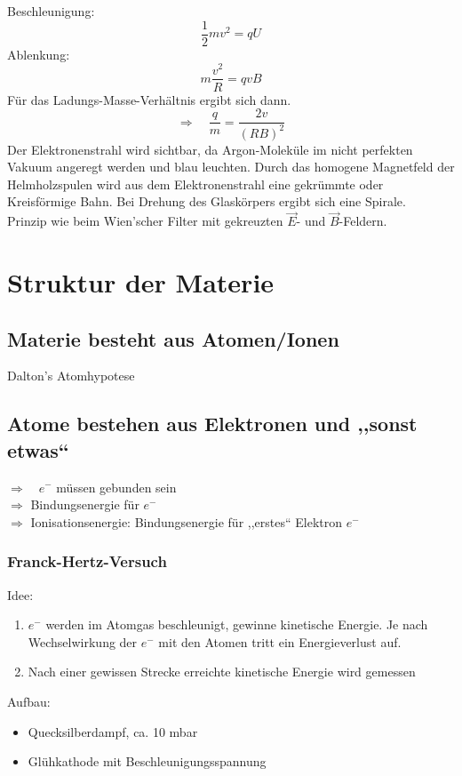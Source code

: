 \\
\\
Beschleunigung:
\begin{equation*}
\frac{1}{2} m v^2 = q U
\end{equation*}
Ablenkung:
\begin{equation*}
m \frac{v^2}{R} = q v B
\end{equation*}
Für das Ladungs-Masse-Verhältnis ergibt sich dann.
\begin{equation*}
\Rightarrow \quad \frac{q}{m} = \frac{2 v}{(RB)^2}
\end{equation*}
Der Elektronenstrahl wird sichtbar, da Argon-Moleküle im nicht perfekten Vakuum angeregt werden und blau leuchten. Durch das homogene Magnetfeld der Helmholzspulen wird aus dem Elektronenstrahl eine gekrümmte oder Kreisförmige Bahn. Bei Drehung des Glaskörpers ergibt sich eine Spirale.\\[5pt]
Prinzip wie beim Wien'scher Filter mit gekreuzten $ \vec{E} $- und $ \vec{B} $-Feldern.

\section{Struktur der Materie}

\subsection{Materie besteht aus Atomen/Ionen}

Dalton's Atomhypotese

\subsection{Atome bestehen aus Elektronen und ,,sonst etwas``}

$ \Rightarrow \quad e^- $ müssen gebunden sein\\
$ \Rightarrow $ Bindungsenergie für $ e^- $\\
$ \Rightarrow $ Ionisationsenergie: Bindungsenergie für ,,erstes`` Elektron $ e^- $

\subsubsection{Franck-Hertz-Versuch}

Idee:
\begin{enumerate}[1)]
	\item $ e^- $ werden im Atomgas beschleunigt, gewinne kinetische Energie. Je nach Wechselwirkung der $ e^- $ mit den Atomen tritt ein Energieverlust auf.
	\item Nach einer gewissen Strecke erreichte kinetische Energie wird gemessen
\end{enumerate}
Aufbau:
\begin{itemize}
	\item Quecksilberdampf, ca. 10 mbar
	\item Glühkathode mit Beschleunigungsspannung
\end{itemize}

